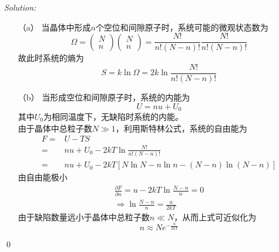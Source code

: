 \documentclass[12pt,a4paper]{article}
\newenvironment{sol}
    {\emph{Solution:}
    }
    {
    \qed
    }
\begin{document}
\begin{sol}
\begin{itemize}
\item[（a）] 当晶体中形成$n$个空位和间隙原子时，系统可能的微观状态数为
\begin{equation}
\Omega=\left(\begin{array}{c}N\\n\end{array}\right)\left(\begin{array}{c}N\\n\end{array}\right)=\frac{N!}{n!(N-n)!}\frac{N!}{n!(N-n)!}
\end{equation}
故此时系统的熵为
\begin{equation}
S=k\ln\Omega=2k\ln\frac{N!}{n!(N-n)!}
\end{equation}
\item[（b）] 当形成空位和间隙原子时，系统的内能为
\begin{equation}
U=nu+U_0
\end{equation}
其中$U_0$为相同温度下，无缺陷时系统的内能。\\
由于晶体中总粒子数$N\gg1$，利用斯特林公式，系统的自由能为
\begin{align}
\nonumber F=&U-TS\\
\nonumber=&nu+U_0-2kT\ln\frac{N!}{n!(N-n)!}\\
=&nu+U_0-2kT[N\ln N-n\ln n-(N-n)\ln(N-n)]
\end{align}
由自由能极小
\begin{gather}
\frac{\partial F}{\partial n}=u-2kT\ln\frac{N-n}{n}=0\\
\Longrightarrow\ln\frac{N-n}{n}=\frac{u}{2kT}
\end{gather}
由于缺陷数量远小于晶体中总粒子数$n\ll N$，从而上式可近似化为
\begin{equation}
n\approx Ne^{-\frac{u}{2kT}}
\end{equation}
\end{itemize}
\end{sol}
\end{document}
